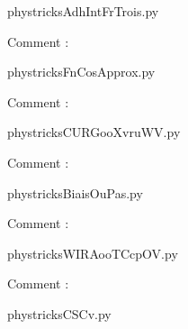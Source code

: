     \newcommand{\CaptionFigAdhIntFrTrois}{<+Type your caption here+>}
    \begin{center}
        
    \end{center}
    phystricksAdhIntFrTrois.py

    Comment : 

    \clearpage
    


    \newcommand{\CaptionFigFnCosApprox}{<+Type your caption here+>}
    \begin{center}
        
    \end{center}
    phystricksFnCosApprox.py

    Comment : 

    \clearpage
    


    \newcommand{\CaptionFigCURGooXvruWV}{<+Type your caption here+>}
    \begin{center}
        
    \end{center}
    phystricksCURGooXvruWV.py

    Comment : 

    \clearpage
    


    \newcommand{\CaptionFigBiaisOuPas}{<+Type your caption here+>}
    \begin{center}
        
    \end{center}
    phystricksBiaisOuPas.py

    Comment : 

    \clearpage
    


    \newcommand{\CaptionFigWIRAooTCcpOV}{<+Type your caption here+>}
    \begin{center}
        
    \end{center}
    phystricksWIRAooTCcpOV.py

    Comment : 

    \clearpage
    


    \newcommand{\CaptionFigCSCv}{<+Type your caption here+>}
    \begin{center}
        
    \end{center}
    phystricksCSCv.py

